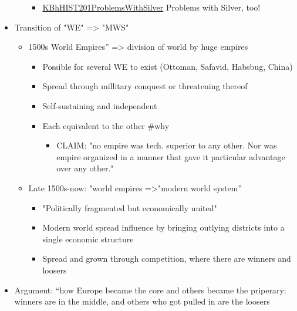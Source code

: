 \documentclass[letterpaper]{article}
\begin{document}
\begin{itemize}
\begin{itemize}
\begin{itemize}
\item \href{KBhHIST201ProblemsWithSilver.org}{KBhHIST201ProblemsWithSilver}
Problems with Silver, too!
\end{itemize}
\end{itemize}

\item Transition of "WE" => "MWS"

\begin{itemize}
\item 1500s World Empires” => division of world by huge empires

\begin{itemize}
\item Possible for several WE to exist (Ottoman, Safavid, Habsbug,
China)
\item Spread through millitary conquest or threatening thereof
\item Self-sustaining and independent
\item Each equivalent to the other \#why

\begin{itemize}
\item CLAIM: "no empire was tech. superior to any other. Nor was
empire organized in a manner that gave it particular advantage
over any other."
\end{itemize}
\end{itemize}

\item Late 1500s-now: "world empires =>"modern world system”

\begin{itemize}
\item "Politically fragmented but economically united"
\item Modern world spread influence by bringing outlying districts into
a single economic structure
\item Spread and grown through competition, where there are winners and
loosers
\end{itemize}
\end{itemize}

\item Argument: “how Europe became the core and others became the priperary:
winners are in the middle, and others who got pulled in are the
loosers
\end{itemize}
\end{document}
